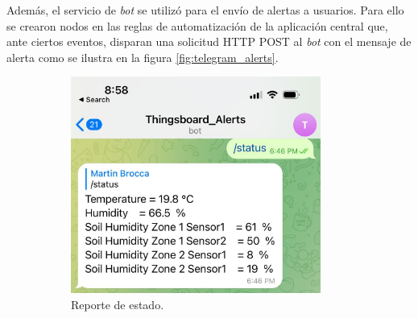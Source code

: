 Además, el servicio de \textit{bot} se utilizó para el envío de alertas a  usuarios. Para ello se crearon nodos en las reglas de automatización de la aplicación central que, ante ciertos eventos, disparan una solicitud HTTP POST al \textit{bot} con el mensaje de alerta como se ilustra en la figura \ref{fig:telegram_alerts}.



\begin{figure}[!htpb]
     \centering
     \begin{subfigure}[b]{0.45\textwidth}
	    \centering
	    \includegraphics[width=0.9\textwidth]{./Figures/Telegram_Status.jpg}
	     \caption[Reporte de estado]{Reporte de estado.}
	     \label{fig:telegram_status}
     \end{subfigure}
     \hfill
     \begin{subfigure}[b]{0.45\textwidth}
	\centering

\end{subfigure}
\end{figure}
